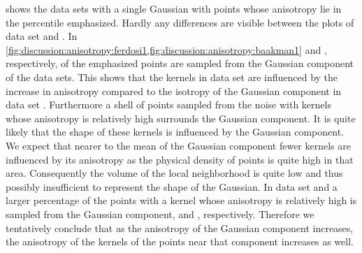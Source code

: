 			 shows the data sets with a single Gaussian with points whose anisotropy lie in the  percentile emphasized. 
				Hardly any differences are visible between the plots of data set \ferdosiOne and \baakmanOne. 
					In \cref{fig:discussion:anisotropy:ferdosi1,fig:discussion:anisotropy:baakman1}  and , respectively, of the emphasized points are sampled from the Gaussian component of the data sets. This shows that the kernels in data set \baakmanOne are influenced by the increase in anisotropy compared to the isotropy of the Gaussian component in data set \ferdosiOne.
					Furthermore a shell of points sampled from the noise with kernels whose anisotropy is relatively high surrounds the Gaussian component. It is quite likely that the shape of these kernels is influenced by the Gaussian component.
					We expect that nearer to the mean of the Gaussian component fewer kernels are influenced by its anisotropy as the physical density of points is quite high in that area. Consequently the volume of the local neighborhood is quite low and thus possibly insufficient to represent the shape of the Gaussian.
				In data set \baakmanFour and \baakmanFive a larger percentage of the points with a kernel whose anisotropy is relatively high is sampled from the Gaussian component,  and , respectively. 
				Therefore we tentatively conclude that as the anisotropy of the Gaussian component increases, the anisotropy of the kernels of the points near that component increases as well.
		
